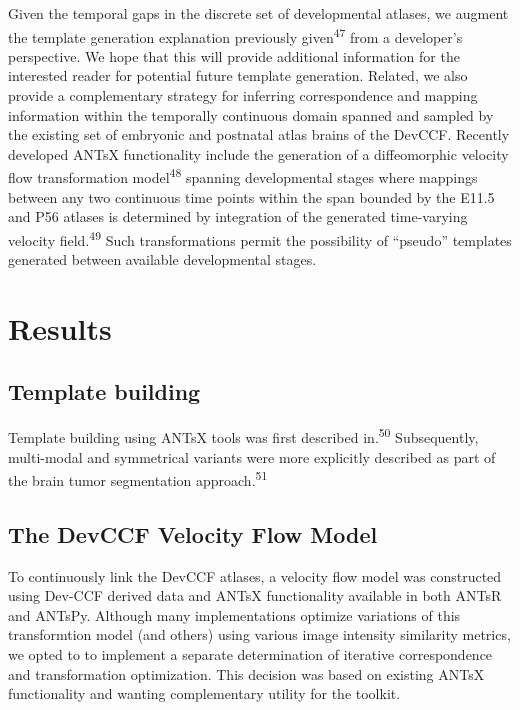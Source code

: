 \documentclass[
  12pt,
]{article}
\begin{document}
Given the temporal gaps in the discrete set of developmental atlases, we
augment the template generation explanation previously
given\textsuperscript{47} from a developer's perspective. We hope that
this will provide additional information for the interested reader for
potential future template generation. Related, we also provide a
complementary strategy for inferring correspondence and mapping
information within the temporally continuous domain spanned and sampled
by the existing set of embryonic and postnatal atlas brains of the
DevCCF. Recently developed ANTsX functionality include the generation of
a diffeomorphic velocity flow transformation model\textsuperscript{48}
spanning developmental stages where mappings between any two continuous
time points within the span bounded by the E11.5 and P56 atlases is
determined by integration of the generated time-varying velocity
field.\textsuperscript{49} Such transformations permit the possibility
of ``pseudo'' templates generated between available developmental
stages.

\clearpage
\newpage

\hypertarget{results}{%
\section*{Results}\label{results}}

\hypertarget{template-building}{%
\subsection*{Template building}\label{template-building}}

Template building using ANTsX tools was first described
in.\textsuperscript{50} Subsequently, multi-modal and symmetrical
variants were more explicitly described as part of the brain tumor
segmentation approach.\textsuperscript{51}

\hypertarget{the-devccf-velocity-flow-model}{%
\subsection*{The DevCCF Velocity Flow
Model}\label{the-devccf-velocity-flow-model}}

To continuously link the DevCCF atlases, a velocity flow model was
constructed using Dev-CCF derived data and ANTsX functionality available
in both ANTsR and ANTsPy. Although many implementations optimize
variations of this transformtion model (and others) using various image
intensity similarity metrics, we opted to to implement a separate
determination of iterative correspondence and transformation
optimization. This decision was based on existing ANTsX functionality
and wanting complementary utility for the toolkit.
\end{document}
